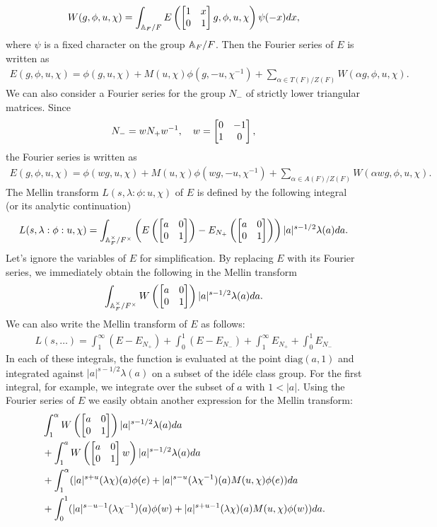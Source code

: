 \begin{align}
    W(g, \phi, u, \chi) = \int_{\mathbb{A}_F /F} E\left(\begin{bmatrix} 1 & x \\ 0 & 1 \end{bmatrix}g, \phi, u, \chi\right)\psi(-x)dx,
\end{align}
where $\psi$ is a fixed character on the group $\mathbb{A}_F/F$.
Then the Fourier series of $E$ is written as
\begin{align}
    E(g, \phi, u, \chi) = \phi(g, u, \chi) + M(u, \chi) \phi(g, -u, \chi^{-1}) + \sum_{\alpha\in T(F)/Z(F)} W(\alpha g, \phi, u, \chi).
\end{align}
We can also consider a Fourier series for the group $N_{-}$ of strictly lower triangular matrices.
Since
\begin{align}
    N_- = wN_{+}w^{-1}, \quad w = \begin{bmatrix} 0 & -1 \\ 1 & 0 \end{bmatrix},
\end{align}
the Fourier series is written as
\begin{align}
    E(g, \phi, u, \chi) = \phi(wg, u, \chi) + M(u, \chi) \phi(wg, -u, \chi^{-1}) + \sum_{\alpha\in A(F)/Z(F)} W(\alpha w g, \phi, u, \chi).
\end{align}
The Mellin transform $L(s, \lambda:\phi:u, \chi)$ of $E$ is defined by the following integral (or its analytic continuation)
\begin{align}
    L(s, \lambda:\phi:u, \chi) = \int_{\mathbb{A}_F^\times /F^\times} \left( E\left(\begin{bmatrix} a & 0 \\ 0 & 1 \end{bmatrix}\right) - E_{N_{+}}\left(\begin{bmatrix} a & 0 \\ 0 & 1 \end{bmatrix}\right)\right) |a|^{s-1/2} \lambda(a) da.
\end{align}
Let's ignore the variables of $E$ for simplification.
By replacing $E$ with its Fourier series, we immediately obtain the following in the Mellin transform
\begin{align}
    \int_{\mathbb{A}_F^\times /F^\times} W\left(\begin{bmatrix} a & 0 \\ 0 & 1 \end{bmatrix}\right) |a|^{s-1/2} \lambda(a) da.
\end{align}
We can also write the Mellin transform of $E$ as follows:
\begin{align}
\label{eqn:8.2.12}
    L(s, \dots) =\int_{1}^{\infty} (E-E_{N_{+}}) + \int_{0}^{1} (E-E_{N_{-}}) + \int_{1}^{\infty} E_{N_+} + \int_{0}^{1} E_{N_{-}}
\end{align}
In each of these integrals, the function is evaluated at the point $\mathrm{diag}(a, 1)$ and integrated against $|a|^{s-1/2}\lambda(a)$ on a subset of the id\'ele class group.
For the first integral, for example, we integrate over the subset of $a$ with $1<|a|$.
Using the Fourier series of $E$ we easily obtain another expression for the Mellin transform:
\begin{equation}
\begin{aligned}
    &\int_{1}^{\alpha} W\left(\begin{bmatrix} a & 0 \\ 0 & 1 \end{bmatrix}\right)|a|^{s-1/2} \lambda(a) da \\
    &+ \int_{1}^{a} W\left(\begin{bmatrix} a & 0 \\ 0 & 1 \end{bmatrix}w\right)|a|^{s-1/2} \lambda(a) da  \\
    &+ \int_{1}^{\alpha} (|a|^{s+u}(\lambda \chi)(a)\phi(e) + |a|^{s-u}(\lambda\chi^{-1})(a)M(u, \chi)\phi(e)) da  \\
    &+ \int_{0}^{1} (|a|^{s-u-1} (\lambda \chi^{-1})(a) \phi(w) + |a|^{s+u-1}(\lambda\chi)(a) M(u, \chi)\phi(w)) da. 
\end{aligned}
\end{equation}
